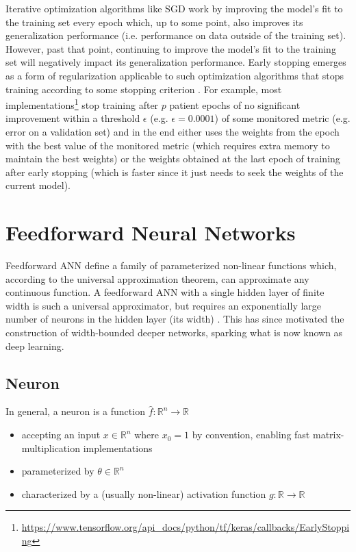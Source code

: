 Iterative optimization algorithms like \ac{SGD} work by improving the model's fit to the training set every epoch which, up to some point, also improves its generalization performance (i.e. performance on data outside of the training set). However, past that point, continuing to improve the model's fit to the training set will negatively impact its generalization performance. Early stopping emerges as a form of regularization applicable to such optimization algorithms that stops training according to some stopping criterion \cite{earlystopping} \cite{deeplearning}. For example, most implementations\footnote{\url{https://www.tensorflow.org/api_docs/python/tf/keras/callbacks/EarlyStopping}} stop training after $p$ patient epochs of no significant improvement within a threshold $\epsilon$ (e.g. $\epsilon = 0.0001$) of some monitored metric (e.g. error on a validation set) and in the end either uses the weights from the epoch with the best value of the monitored metric (which requires extra memory to maintain the best weights) or the weights obtained at the last epoch of training after early stopping (which is faster since it just needs to seek the weights of the current model).

\section{Feedforward Neural Networks}

Feedforward \ac{ANN} define a family of parameterized non-linear functions which, according to the universal approximation theorem, can approximate any continuous function. A feedforward \ac{ANN} with a single hidden layer of finite width is such a universal approximator, but requires an exponentially large number of neurons in the hidden layer (its width) \cite{uat}. This has since motivated the construction of width-bounded deeper networks, sparking what is now known as deep learning.

\subsection{Neuron}

In general, a neuron is a function $\hat{f} \colon \mathbb{R}^n \to \mathbb{R}$

\begin{itemize}
    \item accepting an input $x \in \mathbb{R}^{n}$ where $x_0 = 1$ by convention, enabling fast matrix-multiplication implementations
    \item parameterized by $\theta \in \mathbb{R}^{n}$
    \item characterized by a (usually non-linear) activation function $g \colon \mathbb{R} \to \mathbb{R}$
\end{itemize}

